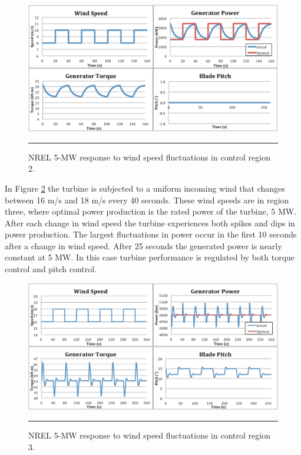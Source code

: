 \begin{figure}[htbp]
	\centering
		\includegraphics[width=\linewidth]{Figures/ch3Figures/fig3-3.png}
		\rule{35em}{0.5pt}
	\caption{NREL 5-MW response to wind speed fluctuations in control region 2.}
	\label{fig3-3}
\end{figure}

In Figure \ref{fig3-4} the turbine is subjected to a uniform incoming wind that changes between 16 m/s and 18 m/s every 40 seconds. These wind speeds are in region three, where optimal power production is the rated power of the turbine, 5 MW. After each change in wind speed the turbine experiences both spikes and dips in power production.  The largest fluctuations in power occur in the first 10 seconds after a change in wind speed. After 25 seconds the generated power is nearly constant at 5 MW.  In this case turbine performance is regulated by both torque control and pitch control. 

\begin{figure}[htbp]
	\centering
		\includegraphics[width=\linewidth]{Figures/ch3Figures/fig3-4.png}
		\rule{35em}{0.5pt}
	\caption{NREL 5-MW response to wind speed fluctuations in control region 3.}
	\label{fig3-4}
\end{figure}

